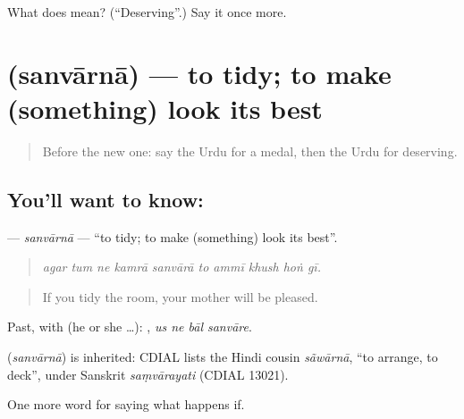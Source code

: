 \begin{tcolorbox}[breakable,colback=teal!4,colframe=teal!35!black,title={Before you move on}]
What does  mean? (\textquotedblleft{}Deserving\textquotedblright{}.) Say it once more.
\end{tcolorbox}
\section[\texorpdfstring{\ur{سنوارنا} (sanvārnā)}{سنوارنا (sanvārnā)}]{ (sanvārnā) — to tidy; to make (something) look its best}

\label{lesson:UR-C382-sanvarna}



\begin{quote}
Before the new one: say the Urdu for a medal, then the Urdu for deserving.
\end{quote}

\subsection*{You'll want to know: }
\textbf{} — \emph{sanvārnā} — \textquotedblleft{}to tidy; to make (something) look its best\textquotedblright{}.

\begin{quote}
         
\end{quote}

\begin{quote}
\emph{agar tum ne kamrā sanvārā to ammī khush hoṅ gī.}
\end{quote}

\begin{quote}
If you tidy the room, your mother will be pleased.
\end{quote}

Past, with  (he or she …):    , \emph{us ne bāl sanvāre}.

\begin{cousinweb}
\textbf{} (\emph{sanvārnā}) is inherited: CDIAL lists the Hindi cousin \emph{sãwārnā}, \textquotedblleft{}to arrange, to deck\textquotedblright{}, under Sanskrit \emph{saṃvārayati} (CDIAL 13021).
\end{cousinweb}

\begin{grammarlens}[title={What you've built}]
One more word for saying what happens if.
\end{grammarlens}

